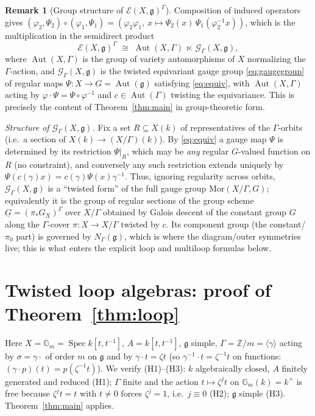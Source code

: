 \documentclass{amsart}
\theoremstyle{definition}
\newtheorem{remark}{Remark}
\DeclareMathOperator{\Aut}{Aut}
\DeclareMathOperator{\Spec}{Spec}
\newcommand{\Gm}{\mathbb{G}_m}
\newcommand{\g}{\mathfrak{g}}
\newcommand{\Z}{\mathbb{Z}}
\begin{document}
\begin{remark}[Group structure of $\mathcal E(X,\g)^\Gamma$]
\label{rem:groupstr}
Composition of induced operators gives
$(\varphi_2,\Psi_2)\circ(\varphi_1,\Psi_1)
=(\varphi_2\varphi_1,\ x\mapsto\Psi_2(x)\,\Psi_1(\varphi_2^{-1}x))$,
which is the multiplication in the semidirect product
\[
\mathcal E(X,\g)^\Gamma\;\cong\;
\Aut(X,\Gamma)\ \ltimes\ \mathcal G_\Gamma(X,\g),
\]
where $\Aut(X,\Gamma)$ is the group of variety automorphisms of $X$
normalizing the $\Gamma$-action, and $\mathcal G_\Gamma(X,\g)$ is the
twisted equivariant gauge group \eqref{eq:gaugegroup} of regular maps
$\Psi\colon X\to G=\Aut(\g)$ satisfying \eqref{eq:equiv}, with
$\Aut(X,\Gamma)$ acting by $\varphi\cdot\Psi=\Psi\circ\varphi^{-1}$ and
$c\in\Aut(\Gamma)$ twisting the equivariance.  This is precisely the
content of Theorem~\ref{thm:main} in group-theoretic form.

\medskip
\noindent\emph{Structure of $\mathcal G_\Gamma(X,\g)$.}  Fix a set
$R\subseteq X(k)$ of representatives of the $\Gamma$-orbits (i.e.\ a section
of $X(k)\to (X/\Gamma)(k)$).  By \eqref{eq:equiv} a gauge map $\Psi$ is
determined by its restriction $\Psi|_R$, which may be \emph{any} regular
$G$-valued function on $R$ (no constraint), and conversely any such
restriction extends uniquely by $\Psi(c(\gamma)x)=c(\gamma)\Psi(x)
\gamma^{-1}$.  Thus, ignoring regularity across orbits, $\mathcal
G_\Gamma(X,\g)$ is a ``twisted form'' of the full gauge group
$\mathrm{Mor}(X/\Gamma,G)$; equivalently it is the group of regular
sections of the group scheme $\underline G=(\pi_*G_X)^\Gamma$ over
$X/\Gamma$ obtained by Galois descent of the constant group $G$ along the
$\Gamma$-cover $\pi\colon X\to X/\Gamma$ twisted by $c$.  Its component
group (the constant/$\pi_0$ part) is governed by $N_\Gamma(\g)$, which is
where the diagram/outer symmetries live; this is what enters the explicit
loop and multiloop formulas below.
\end{remark}

\section{Twisted loop algebras: proof of Theorem~\ref{thm:loop}}
\label{sec:loop}

Here $X=\Gm=\Spec k[t,t^{-1}]$, $A=k[t,t^{-1}]$, $\g$ simple,
$\Gamma=\Z/m=\langle\gamma\rangle$ acting by $\sigma=\gamma\cdot$ of order
$m$ on $\g$ and by $\gamma\cdot t=\zeta t$ (so $\gamma^{-1}\cdot t=
\zeta^{-1}t$ on functions: $(\gamma\cdot p)(t)=p(\zeta^{-1}t)$).  We verify
(H1)--(H3): $k$ algebraically closed, $A$ finitely generated and reduced
(H1); $\Gamma$ finite and the action $t\mapsto\zeta^{j}t$ on
$\Gm(k)=k^\times$ is free because $\zeta^j t=t$ with $t\ne0$ forces
$\zeta^j=1$, i.e.\ $j\equiv0$ (H2); $\g$ simple (H3).  Theorem~\ref{thm:main}
applies.
\end{document}
